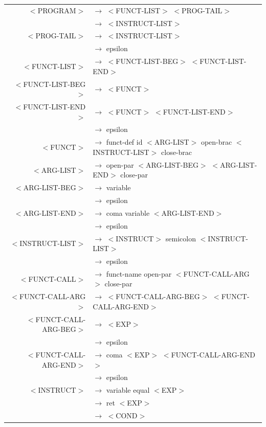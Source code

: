 \documentclass[a4paper,10pt]{article}
\begin{document}
\hspace{-3.0cm}\begin{tabular}{rl}	
	$<$PROGRAM$>$				& $\rightarrow$ $<$FUNCT-LIST$>$ $<$PROG-TAIL$>$ \\
								& $\rightarrow$ $<$INSTRUCT-LIST$>$ \\
	$<$PROG-TAIL$>$				& $\rightarrow$ $<$INSTRUCT-LIST$>$ \\
								& $\rightarrow$ epsilon \\
						
	$<$FUNCT-LIST$>$			& $\rightarrow$ $<$FUNCT-LIST-BEG$>$ $<$FUNCT-LIST-END$>$ \\
	$<$FUNCT-LIST-BEG$>$		& $\rightarrow$ $<$FUNCT$>$ \\
	$<$FUNCT-LIST-END$>$		& $\rightarrow$ $<$FUNCT$>$ $<$FUNCT-LIST-END$>$ \\
								& $\rightarrow$ epsilon \\
	$<$FUNCT$>$					& $\rightarrow$ funct-def id $<$ARG-LIST$>$ open-brac $<$INSTRUCT-LIST$>$ close-brac \\
	$<$ARG-LIST$>$				& $\rightarrow$ open-par $<$ARG-LIST-BEG$>$ $<$ARG-LIST-END$>$ close-par\\
	$<$ARG-LIST-BEG$>$			& $\rightarrow$ variable \\
								& $\rightarrow$ epsilon \\
	$<$ARG-LIST-END$>$			& $\rightarrow$ coma variable $<$ARG-LIST-END$>$ \\
								& $\rightarrow$ epsilon \\
	$<$INSTRUCT-LIST$>$			& $\rightarrow$ $<$INSTRUCT$>$ semicolon $<$INSTRUCT-LIST$>$ \\
								& $\rightarrow$ epsilon \\
	$<$FUNCT-CALL$>$			& $\rightarrow$ funct-name open-par $<$FUNCT-CALL-ARG$>$ close-par \\
	$<$FUNCT-CALL-ARG$>$		& $\rightarrow$ $<$FUNCT-CALL-ARG-BEG$>$ $<$FUNCT-CALL-ARG-END$>$ \\
	$<$FUNCT-CALL-ARG-BEG$>$	& $\rightarrow$ $<$EXP$>$ \\
								& $\rightarrow$ epsilon \\
	$<$FUNCT-CALL-ARG-END$>$	& $\rightarrow$ coma $<$EXP$>$ $<$FUNCT-CALL-ARG-END$>$ \\
								& $\rightarrow$ epsilon \\
	$<$INSTRUCT$>$				& $\rightarrow$ variable equal $<$EXP$>$ \\
								& $\rightarrow$ ret $<$EXP$>$ \\
								& $\rightarrow$ $<$COND$>$ \\

\end{tabular}
\end{document}
